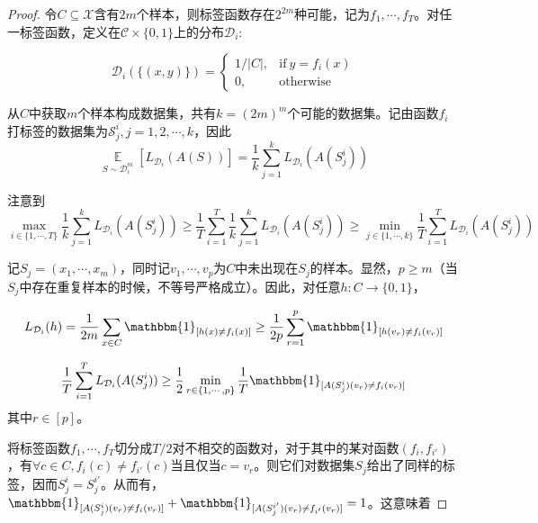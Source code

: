 \documentclass{article}
\newtheorem*{proof}{Proof}
\begin{document}
	\begin{proof}
	令$C\subseteq\mathcal{X}$含有$2m$个样本，则标签函数存在$2^{2m}$种可能，记为$f_1,\cdots,f_T$。对任一标签函数，定义在$\mathcal{C}\times\{0,1\}$上的分布$\mathcal{D}_i$:
	
	\begin{equation*}
	\mathcal{D}_i(\{(x,y)\})=\left\{
	\begin{matrix} 1/|C|,& \mathrm{if}\ y=f_i(x) \\ 0,& \mathrm{otherwise} 
	\end{matrix}\right.
	\end{equation*}
	
	从$C$中获取$m$个样本构成数据集，共有$k=(2m)^m$个可能的数据集。记由函数$f_i$打标签的数据集为$\mathcal{S}_j^i, j=1,2,\cdots,k$，因此
	\begin{equation*}
	\mathop{\mathbb{E}}\limits_{S\sim\mathcal{D}_i^m}[L_{\mathcal{D}_i}(A(S))]=\frac{1}{k}\sum_{j=1}^kL_{\mathcal{D}_i}(A(S_j^i))
	\end{equation*}
	
注意到	
	\begin{equation*}
	\max_{i\in\{1,\cdots,T\}} \frac{1}{k}\sum_{j=1}^k L_{\mathcal{D}_i}(A(S_j^i)) \geq \frac{1}{T}\sum_{i=1}^T \frac{1}{k} \sum_{j=1}^k L_{\mathcal{D}_i}(A(S_j^i)) \geq \min_{j\in\{1,\cdots,k\}}\frac{1}{T}\sum_{i=1}^T L_{\mathcal{D}_i} (A(S_j^i))
	\end{equation*}

	记$S_j=(x_1,\cdots,x_m)$，同时记$v_1,\cdots,v_p$为$C$中未出现在$S_j$的样本。显然，$p\geq m$（当$S_j$中存在重复样本的时候，不等号严格成立）。因此，对任意$h:C\rightarrow\{0,1\}$，
	
	\begin{equation*}
	L_{\mathcal{D}_i}(h)=\frac{1}{2m}\sum_{x\in C}\mathbbm{1}_{[h(x)\neq f_i(x)]}\geq\frac{1}{2p}\sum_{r=1}^p\mathbbm{1}_{[h(v_r)\neq f_i(v_r)]}
	\end{equation*}

	\begin{equation*}
	\frac{1}{T}\sum_{i=1}^T L_{\mathcal{D}_i} (A(S_j^i))\geq\frac{1}{2}\min_{r\in\{1,\cdots,p\}}\frac{1}{T}\mathbbm{1}_{[A(S^i_j)(v_r)\neq f_i(v_r)]}
	\end{equation*}
其中$r\in[p]$。

	将标签函数$f_1,\cdots,f_T$切分成$T/2$对不相交的函数对，对于其中的某对函数$(f_i,f_{i'})$，有$\forall c\in C,f_i(c)\neq f_{i'}(c)$当且仅当$c=v_r$。则它们对数据集$S_j$给出了同样的标签，因而$S_j^i=S_j^{i'}$。从而有， $\mathbbm{1}_{[A(S_j^i)(v_r)\neq f_i(v_r)]}+\mathbbm{1}_{[A(S_j^{i'})(v_r)\neq f_{i'}(v_r)]}=1$。这意味着
	

\end{proof}
\end{document}
